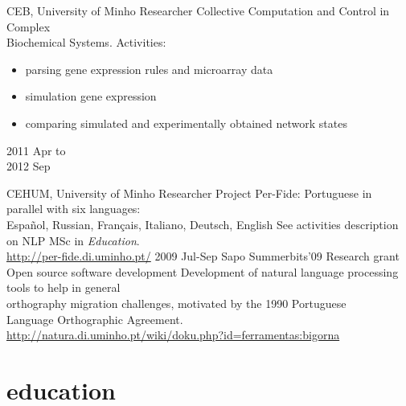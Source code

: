 \documentclass[a4paper]{friggeri-cv}
\begin{document}
\begin{entrylist}
    {CEB, University of Minho}
    {Researcher}
    {Collective Computation and Control in Complex\\
    Biochemical Systems. {\footnotesize Activities:}}
    {
        \begin{itemize}
            \item parsing gene expression rules and microarray data
            \item simulation gene expression
            \item comparing simulated and experimentally obtained
                network states
        \end{itemize}
    }
  \entry
    {\parbox[t][][t]{1.8cm}{2011 {\footnotesize Apr to}\\2012 {\footnotesize Sep}}}
    {CEHUM, University of Minho}
    {Researcher}
    {Project Per-Fide: Portuguese in parallel with six languages:\\
    Español, Russian, Français, Italiano, Deutsch, English}
    {See activities description on NLP MSc in \emph{Education}.\\
    \url{http://per-fide.di.uminho.pt/}}
  \entry
    {2009 {\footnotesize Jul-Sep}}
    {Sapo Summerbits'09}
    {Research grant}
    {Open source software development}
    {\footnotesize
        Development of natural language processing tools to help in general\\
        orthography migration challenges, motivated by the 1990 Portuguese\\
        Language Orthographic Agreement.\\
        \url{http://natura.di.uminho.pt/wiki/doku.php?id=ferramentas:bigorna}
    \vspace{-1cm}
    }
\end{entrylist}

\section{education}
\label{education}
\end{document}
